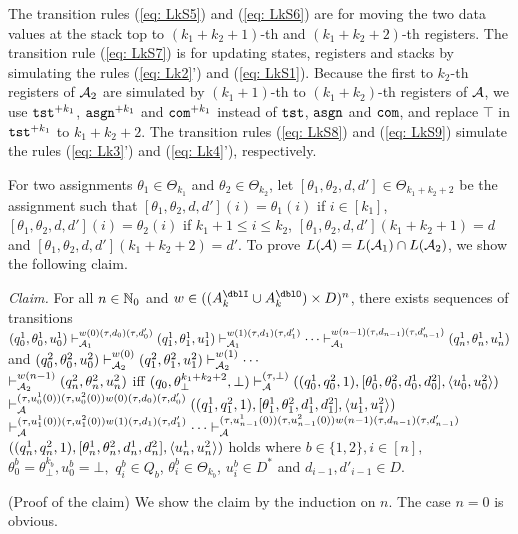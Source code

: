 The transition rules (\ref{eq: LkS5}) and (\ref{eq: LkS6})
are for moving the two data values at the stack top
to $(k_1+k_2+1)$-th and $(k_1+k_2+2)$-th registers.
The transition rule (\ref{eq: LkS7})
is for updating states, registers and stacks
by simulating the rules (\ref{eq: Lk2}') and (\ref{eq: LkS1}).
Because the first to $k_2$-th registers of ${\cal A}_2$ are simulated by $(k_1+1)$-th to $(k_1+k_2)$-th registers of ${\cal A}$,
we use $\mathtt{tst}^{+k_1}$, $\mathtt{asgn}^{+k_1}$ and $\mathtt{com}^{+k_1}$
instead of $\mathtt{tst}$, $\mathtt{asgn}$ and $\mathtt{com}$, and
replace $\top$ in $\mathtt{tst}^{+k_1}$ to $k_1+k_2+2$.
The transition rules (\ref{eq: LkS8}) and (\ref{eq: LkS9})
simulate the rules (\ref{eq: Lk3}') and (\ref{eq: Lk4}'), respectively.

For two assignments $\theta_1\in\Theta_{k_1}$ and $\theta_2\in\Theta_{k_2}$,
let $[\theta_1,\theta_2,d,d']\in\Theta_{k_1+k_2+2}$
be the assignment such that
$[\theta_1,\theta_2,d,d'](i)=\theta_1(i)$ if $i\in[k_1]$,
$[\theta_1,\theta_2,d,d'](i)=\theta_2(i)$ if $k_1+1\leq i\leq k_2$,
$[\theta_1,\theta_2,d,d'](k_1+k_2+1)=d$ and
$[\theta_1,\theta_2,d,d'](k_1+k_2+2)=d'$.
To prove $L({\cal A})=L({\cal A}_1)\cap L({\cal A}_2)$,
we show the following claim.
\par\medskip\noindent
{\it Claim.}
For all $n\in\mathbb{N}_0$ and $w\in ((A_{k}^\dblI \cup A_{k}^\dblO) \times D)^n$,
there exists sequences of transitions
$(q_0^1,\theta^1_0,u^1_0)\vdash_{{\cal A}_1}^{w(0)(\tau,d_0)(\tau,d'_0)}
(q_1^1,\theta^1_1,u^1_1)\vdash_{{\cal A}_1}^{w(1)(\tau,d_1)(\tau,d'_1)} \cdots \vdash_{{\cal A}_1}^{w(n-1)(\tau,d_{n-1})(\tau,d'_{n-1})}
(q^1_n,\theta^1_n,u^1_n)$ and
$(q_0^2,\theta^2_0,u^2_0)\vdash_{{\cal A}_2}^{w(0)}
(q_1^2,\theta^2_1,u^2_1)\vdash_{{\cal A}_2}^{w(1)} \cdots$\\
$\vdash_{{\cal A}_2}^{w(n-1)} (q^2_n,\theta^2_n,u^2_n)$
iff
$(q_0, \theta^{k_1+k_2+2}_\bot, \bot)
\vdash_{\cal A}^{(\tau,\bot)}
((q^1_0,q^2_0,1),[\theta^1_0,\theta^2_0,d^1_0,d^2_0],\langle u^1_0,u^2_0\rangle)$
$\vdash_{\cal A}^{(\tau,u^1_0(0))(\tau,u^2_0(0))w(0)(\tau,d_0)(\tau,d'_0)}
((q^1_1,q^2_1,1),[\theta^1_1,\theta^2_1,d^1_1,d^2_1],\langle u^1_1,u^2_1\rangle)$\\
$\vdash_{\cal A}^{(\tau,u^1_1(0))(\tau,u^2_1(0))w(1)(\tau,d_1)(\tau,d'_1)}
\cdots\vdash_{\cal A}^{(\tau,u^1_{n-1}(0))(\tau,u^2_{n-1}(0))w(n-1)(\tau,d_{n-1})(\tau,d'_{n-1})}$\\
$((q^1_n,q^2_n,1),[\theta^1_n,\theta^2_n,d^1_n,d^2_n],\langle u^1_n,u^2_n\rangle)$
holds where $b\in\{1,2\}, i\in[n],$
$\theta^b_0=\theta^{k_b}_{\bot}, u^b_0=\bot,$
$q^b_i\in Q_b$, $\theta^b_i\in\Theta_{k_b}$, $u^b_i\in D^*$ and
$d_{i-1}, d'_{i-1}\in D$.
\par\medskip\noindent
(Proof of the claim)
We show the claim by the induction on $n$.
The case $n=0$ is obvious.

